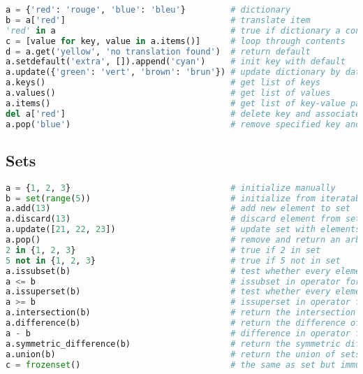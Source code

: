 \begin{lstlisting}[language=Python]
a = {'red': 'rouge', 'blue': 'bleu'}         # dictionary
b = a['red']                                 # translate item
'red' in a                                   # true if dictionary a contains key 'red'
c = [value for key, value in a.items()]      # loop through contents
d = a.get('yellow', 'no translation found')  # return default
a.setdefault('extra', []).append('cyan')     # init key with default
a.update({'green': 'vert', 'brown': 'brun'}) # update dictionary by data from another one
a.keys()                                     # get list of keys
a.values()                                   # get list of values
a.items()                                    # get list of key-value pairs
del a['red']                                 # delete key and associated with it value
a.pop('blue')                                # remove specified key and return the corresponding value
\end{lstlisting}

\subsection{Sets}\label{sets}

\begin{lstlisting}[language=Python]
a = {1, 2, 3}                                # initialize manually
b = set(range(5))                            # initialize from iteratable
a.add(13)                                    # add new element to set
a.discard(13)                                # discard element from set
a.update([21, 22, 23])                       # update set with elements from iterable
a.pop()                                      # remove and return an arbitrary set element
2 in {1, 2, 3}                               # true if 2 in set
5 not in {1, 2, 3}                           # true if 5 not in set
a.issubset(b)                                # test whether every element in a is in b
a <= b                                       # issubset in operator form
a.issuperset(b)                              # test whether every element in b is in a
a >= b                                       # issuperset in operator form
a.intersection(b)                            # return the intersection of two sets as a new set
a.difference(b)                              # return the difference of two or more sets as a new set
a - b                                        # difference in operator form
a.symmetric_difference(b)                    # return the symmetric difference of two sets as a new set
a.union(b)                                   # return the union of sets as a new set
c = frozenset()                              # the same as set but immutable
\end{lstlisting}

